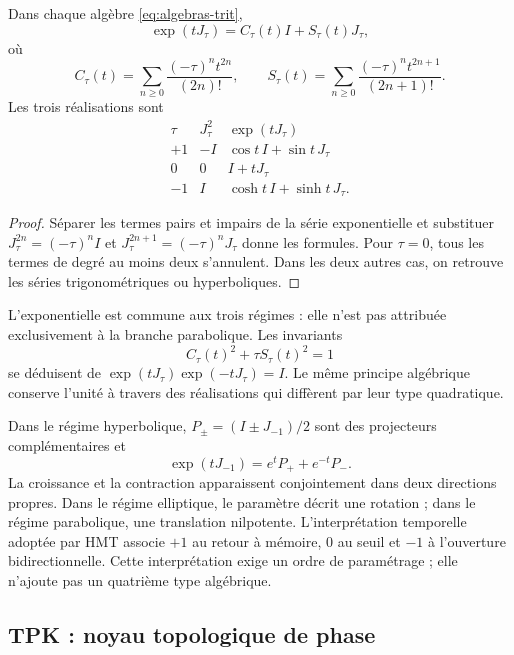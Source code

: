 \begin{proposition}
Dans chaque algèbre \eqref{eq:algebras-trit},
\begin{equation}
 \exp(tJ_\tau)=C_\tau(t)I+S_\tau(t)J_\tau,
\end{equation}
où
\[
 C_\tau(t)=\sum_{n\ge0}\frac{(-\tau)^nt^{2n}}{(2n)!},\qquad
 S_\tau(t)=\sum_{n\ge0}\frac{(-\tau)^nt^{2n+1}}{(2n+1)!}.
\]
Les trois réalisations sont
\[
 \begin{array}{c|c|c}
 \tau&J_\tau^2&\exp(tJ_\tau)\\\hline
 +1&-I&\cos t\,I+\sin t\,J_\tau\\
 0&0&I+tJ_\tau\\
 -1&I&\cosh t\,I+\sinh t\,J_\tau.
 \end{array}
\]
\end{proposition}
\begin{proof}
Séparer les termes pairs et impairs de la série exponentielle et substituer \(J_\tau^{2n}=(-\tau)^nI\) et \(J_\tau^{2n+1}=(-\tau)^nJ_\tau\) donne les formules. Pour \(\tau=0\), tous les termes de degré au moins deux s'annulent. Dans les deux autres cas, on retrouve les séries trigonométriques ou hyperboliques.
\end{proof}

L'exponentielle est commune aux trois régimes : elle n'est pas attribuée exclusivement à la branche parabolique. Les invariants
\[
 C_\tau(t)^2+\tau S_\tau(t)^2=1
\]
se déduisent de \(\exp(tJ_\tau)\exp(-tJ_\tau)=I\). Le même principe algébrique conserve l'unité à travers des réalisations qui diffèrent par leur type quadratique.

Dans le régime hyperbolique, \(P_\pm=(I\pm J_{-1})/2\) sont des projecteurs complémentaires et
\[
 \exp(tJ_{-1})=e^tP_++e^{-t}P_-.
\]
La croissance et la contraction apparaissent conjointement dans deux directions propres. Dans le régime elliptique, le paramètre décrit une rotation ; dans le régime parabolique, une translation nilpotente. L'interprétation temporelle adoptée par HMT associe \(+1\) au retour à mémoire, \(0\) au seuil et \(-1\) à l'ouverture bidirectionnelle. Cette interprétation exige un ordre de paramétrage ; elle n'ajoute pas un quatrième type algébrique.





\newpage
\subsection{TPK : noyau topologique de phase}

